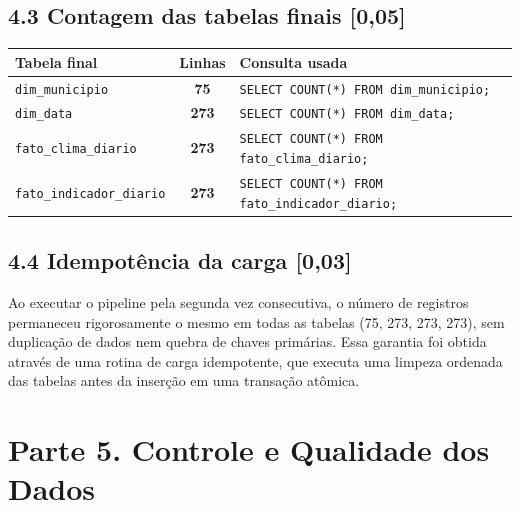 \documentclass[11pt,a4paper]{article}
\begin{document}
\subsection*{4.3 Contagem das tabelas finais \textnormal{[0,05]}}

\begin{table}[h!]
\centering
\small
\begin{tabular}{l c l}
\toprule
\textbf{Tabela final} & \textbf{Linhas} & \textbf{Consulta usada} \\
\midrule
\texttt{dim\_municipio} & \textbf{75} & \texttt{SELECT COUNT(*) FROM dim\_municipio;} \\
\texttt{dim\_data} & \textbf{273} & \texttt{SELECT COUNT(*) FROM dim\_data;} \\
\texttt{fato\_clima\_diario} & \textbf{273} & \texttt{SELECT COUNT(*) FROM fato\_clima\_diario;} \\
\texttt{fato\_indicador\_diario} & \textbf{273} & \texttt{SELECT COUNT(*) FROM fato\_indicador\_diario;} \\
\bottomrule
\end{tabular}
\end{table}

\subsection*{4.4 Idempotência da carga \textnormal{[0,03]}}
Ao executar o pipeline pela segunda vez consecutiva, o número de registros permaneceu rigorosamente o mesmo em todas as tabelas (75, 273, 273, 273), sem duplicação de dados nem quebra de chaves primárias. Essa garantia foi obtida através de uma rotina de carga idempotente, que executa uma limpeza ordenada das tabelas antes da inserção em uma transação atômica.

\section*{Parte 5. Controle e Qualidade dos Dados}
\end{document}
